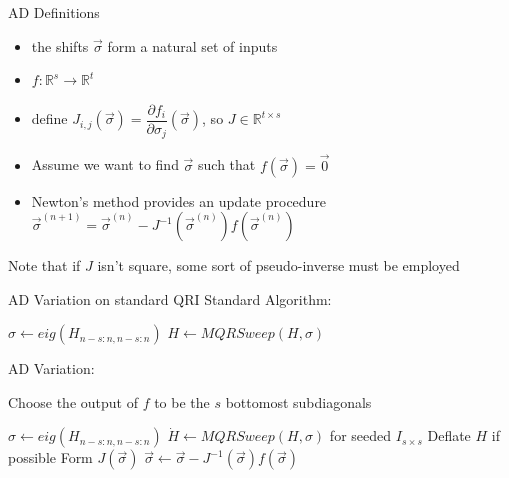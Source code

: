 \documentclass[12pt]{beamer}
\renewcommand{\d}[1]{\dot{#1}}
\begin{document}
  \begin{frame}{AD Definitions}
    \begin{itemize}
      \item the shifts $\vec{\sigma}$ form a natural set of inputs
      \item $f:\mathbb{R}^s \to \mathbb{R}^t$
      \item define $J_{i,j}(\vec{\sigma}) = \dfrac{\partial f_i}{\partial \sigma_j}(\vec{\sigma})$, so $J \in \mathbb{R}^{t \times s}$
      \item Assume we want to find $\vec{\sigma}$ such that $f(\vec{\sigma}) = \vec{0}$
      \item Newton's method provides an update procedure $\vec{\sigma}^{(n+1)} = \vec{\sigma}^{(n)} - J^{-1}(\vec{\sigma}^{(n)}) f(\vec{\sigma}^{(n)})$
    \end{itemize}
    Note that if $J$ isn't square, some sort of pseudo-inverse must be employed
  \end{frame}


  \begin{frame}{AD Variation on standard QRI}
    Standard Algorithm:
    \begin{algorithmic}
      \Repeat
        \State $\sigma \gets eig(H_{n-s:n,n-s:n})$ 
        \State $H \gets MQRSweep(H,\sigma)$ 
    \end{algorithmic}

    AD Variation:
    
    Choose the output of $f$ to be the $s$ bottomost subdiagonals

    \begin{algorithmic}
      \State $\sigma \gets eig(H_{n-s:n,n-s:n})$ 
      \Repeat
        \State $\d{H} \gets MQRSweep(H,\sigma)$ for seeded $I_{s \times s}$
        \State Deflate $H$ if possible
        \State Form $J(\vec{\sigma})$
        \State $\vec{\sigma} \gets \vec{\sigma} - J^{-1}(\vec{\sigma}) f(\vec{\sigma})$
    \end{algorithmic}

  \end{frame}
\end{document}

